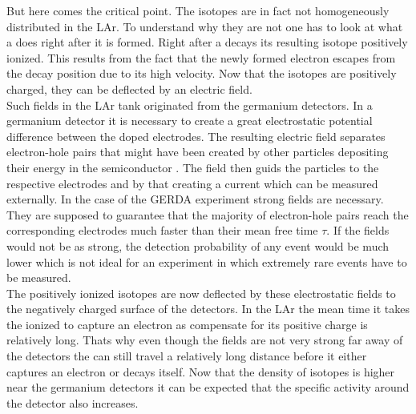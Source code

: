 \documentclass[encoding=utf8,british]{tumphthesis}
\begin{document}
But here comes the critical point.
The  isotopes are in fact not homogeneously distributed in the LAr.
To understand why they are not one has to look at what a  does right after it is formed.
Right after a  decays its resulting  isotope positively ionized.
This results from the fact that the newly formed electron escapes from the decay position due to its high velocity.
Now that the  isotopes are positively charged, they can be deflected by an electric field.
\\

Such fields in the LAr tank originated from the germanium detectors.
In a germanium detector it is necessary to create a great electrostatic potential difference between the doped electrodes.
The resulting electric field separates electron-hole pairs that might have been created by other particles depositing their energy in the semiconductor \cite{spieler_semiconductor_2005}.
The field then guids the particles to the respective electrodes and by that creating a current which can be measured externally.
In the case of the GERDA experiment strong fields are necessary.
They are supposed to guarantee that the majority of electron-hole pairs reach the corresponding electrodes much faster than their mean free time $\tau$. %
If the fields would not be as strong, the detection probability of any event would be much lower which is not ideal for an experiment in which extremely rare events have to be measured.
\\

The positively ionized isotopes are now deflected by these electrostatic fields to the negatively charged surface of the detectors. 
In the LAr the mean time it takes the ionized  to capture an electron as compensate for its positive charge is relatively long. 
Thats why even though the fields are not very strong far away of the detectors the  can still travel a relatively long distance before it either captures an electron or decays itself. 
Now that the density of  isotopes is higher near the germanium detectors it can be expected that the specific activity around the detector also increases.
\\
\end{document}
